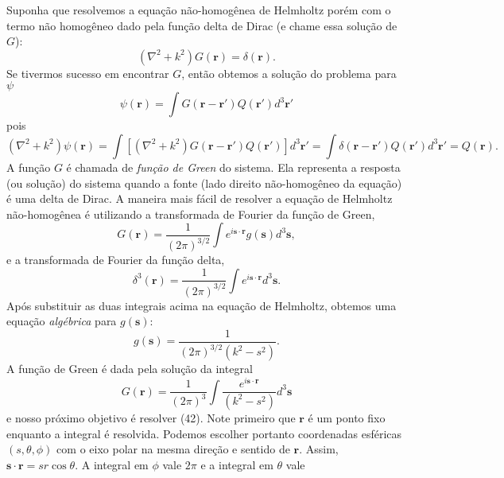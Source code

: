 \documentclass{article}
\begin{document}
Suponha que resolvemos a equação não-homogênea de Helmholtz porém com o termo não homogêneo dado pela função delta de Dirac (e chame essa solução de $G$):
\begin{equation}
    (\nabla^2 + k^2)G(\mathbf{r}) = \delta(\mathbf{r}). 
\end{equation}
Se tivermos sucesso em encontrar $G$, então obtemos a solução do problema para $\psi$
\begin{equation}
    \psi(\mathbf{r}) = \int G(\mathbf{r}-\mathbf{r}')Q(\mathbf{r}')d^3 \mathbf{r}'
\end{equation}
pois
\begin{equation}
    (\nabla^2 + k^2)\psi(\mathbf{r}) = \int \left[ (\nabla^2 + k^2)G(\mathbf{r}-\mathbf{r}')Q(\mathbf{r}') \right]d^3 \mathbf{r}' = \int \delta (\mathbf{r}-\mathbf{r}')Q(\mathbf{r}')d^3 \mathbf{r}' = Q(\mathbf{r}).
\end{equation}
A função $G$ é chamada de \textit{função de Green} do sistema. Ela representa a resposta (ou solução) do sistema quando a fonte (lado direito não-homogêneo da equação) é uma delta de Dirac. A maneira mais fácil de resolver a equação de Helmholtz não-homogênea é utilizando a transformada de Fourier da função de Green,
\begin{equation}
    G(\mathbf{r}) = \frac{1}{(2\pi)^{3/2}}\int e^{i\mathbf{s}\cdot\mathbf{r}}g(\mathbf{s}) d^3 \mathbf{s},
\end{equation}
e a transformada de Fourier da função delta,
\begin{equation}
    \delta^3 (\mathbf{r}) = \frac{1}{(2\pi)^{3/2}}\int e^{i\mathbf{s}\cdot\mathbf{r}} d^3 \mathbf{s}.
\end{equation}
Após substituir as duas integrais acima na equação de Helmholtz, obtemos uma equação \textit{algébrica} para $g(\mathbf{s})$:
\begin{equation}
    g(\mathbf{s}) = \frac{1}{(2\pi)^{3/2} (k^2 - s^2)}.
\end{equation}
A função de Green é dada pela solução da integral
\begin{equation}
    G(\mathbf{r}) = \frac{1}{(2\pi)^3}\int \frac{e^{i\mathbf{s}\cdot\mathbf{r}}}{(k^2 - s^2)}d^3 \mathbf{s}
\end{equation}
e nosso próximo objetivo é resolver (42). Note primeiro que $\mathbf{r}$ é um ponto fixo enquanto a integral é resolvida. Podemos escolher portanto coordenadas esféricas $(s,\theta,\phi)$ com o eixo polar na mesma direção e sentido de $\mathbf{r}$. Assim, $\mathbf{s}\cdot\mathbf{r} = sr\cos\theta$. A integral em $\phi$ vale $2\pi$ e a integral em $\theta$ vale
\end{document}
